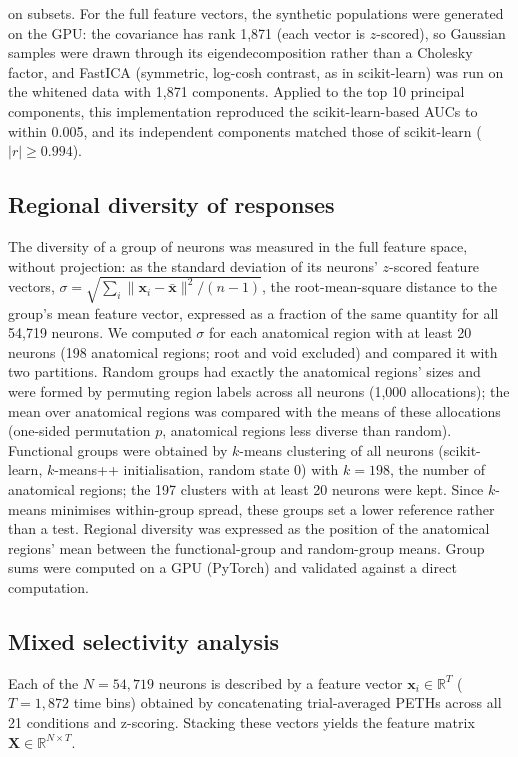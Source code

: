 \documentclass[10pt,lineno]{elife}
\begin{document}
on subsets. For the full feature vectors, the synthetic populations were generated on the GPU: the covariance has rank 1,871 (each vector is $z$-scored), so Gaussian samples were drawn through its eigendecomposition rather than a Cholesky factor, and FastICA (symmetric, log-cosh contrast, as in scikit-learn) was run on the whitened data with 1,871 components. Applied to the top 10 principal components, this implementation reproduced the scikit-learn-based AUCs to within 0.005, and its independent components matched those of scikit-learn ($|r|\geq0.994$).

\subsection{Regional diversity of responses}
The diversity of a group of neurons was measured in the full feature space, without projection: as the standard deviation of its neurons' $z$-scored feature vectors, $\sigma = \sqrt{\sum_i \lVert \mathbf{x}_i - \bar{\mathbf{x}} \rVert^2/(n-1)}$, the root-mean-square distance to the group's mean feature vector, expressed as a fraction of the same quantity for all 54,719 neurons. We computed $\sigma$ for each anatomical region with at least 20 neurons (198 anatomical regions; root and void excluded) and compared it with two partitions. Random groups had exactly the anatomical regions' sizes and were formed by permuting region labels across all neurons (1,000 allocations); the mean over anatomical regions was compared with the means of these allocations (one-sided permutation $p$, anatomical regions less diverse than random). Functional groups were obtained by $k$-means clustering of all neurons (scikit-learn, $k$-means++ initialisation, random state 0) with $k=198$, the number of anatomical regions; the 197 clusters with at least 20 neurons were kept. Since $k$-means minimises within-group spread, these groups set a lower reference rather than a test. Regional diversity was expressed as the position of the anatomical regions' mean between the functional-group and random-group means. Group sums were computed on a GPU (PyTorch) and validated against a direct computation.

\iffalse %
\subsection*{Mixed selectivity analysis}

  Each of the $N = 54{,}719$ neurons is described by a feature vector
  $\mathbf{x}_i \in \mathbb{R}^T$ ($T = 1{,}872$ time bins) obtained by
  concatenating trial-averaged PETHs across all 21 conditions and
  z-scoring. Stacking these vectors yields the feature matrix
  $\mathbf{X} \in \mathbb{R}^{N \times T}$.
\end{document}
